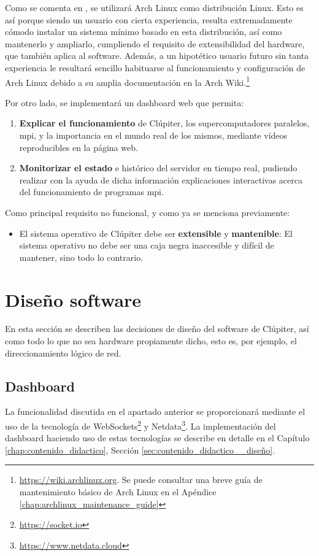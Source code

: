 Como se comenta en , se utilizará Arch Linux como distribución Linux. Esto es así porque siendo un usuario con cierta experiencia, resulta extremadamente cómodo instalar un sistema mínimo basado en esta distribución, así como mantenerlo y ampliarlo, cumpliendo el requisito de extensibilidad del hardware, que también aplica al software. Además, a un hipotético usuario futuro sin tanta experiencia le resultará sencillo habituarse al funcionamiento y configuración de Arch Linux debido a su amplia documentación en la Arch Wiki.\footnote{\url{https://wiki.archlinux.org}. Se puede consultar una breve guía de mantenimiento básico de Arch Linux en el Apéndice \ref{chap:archlinux_maintenance_guide}}

Por otro lado, se implementará un dashboard web que permita:
\begin{enumerate}
    \item \textbf{Explicar el funcionamiento} de Clúpiter, los supercomputadores paralelos, \acrshort{mpi}, y la importancia en el mundo real de los mismos, mediante vídeos reproducibles en la página web.
    \item \textbf{Monitorizar el estado} e histórico del servidor en tiempo real, pudiendo realizar con la ayuda de dicha información explicaciones interactivas acerca del funcionamiento de programas \acrshort{mpi}.
\end{enumerate}

Como principal requisito no funcional, y como ya se menciona previamente:
\begin{itemize}
    \item El sistema operativo de Clúpiter debe ser \textbf{extensible} y \textbf{mantenible}: El sistema operativo no debe ser una caja negra inaccesible y difícil de mantener, sino todo lo contrario.
\end{itemize}

\section{Diseño software}
En esta sección se describen las decisiones de diseño del software de Clúpiter, así como todo lo que no sea hardware propiamente dicho, esto es, por ejemplo, el direccionamiento lógico de red.

\subsection{Dashboard}
La funcionalidad discutida en el apartado anterior se proporcionará mediante el uso de la tecnología de WebSockets\footnote{\url{https://socket.io}} y Netdata\footnote{\url{https://www.netdata.cloud}}. La implementación del dashboard haciendo uso de estas tecnologías se describe en detalle en el Capítulo \ref{chap:contenido_didactico}, Sección \ref{sec:contenido_didactico__diseño}.

